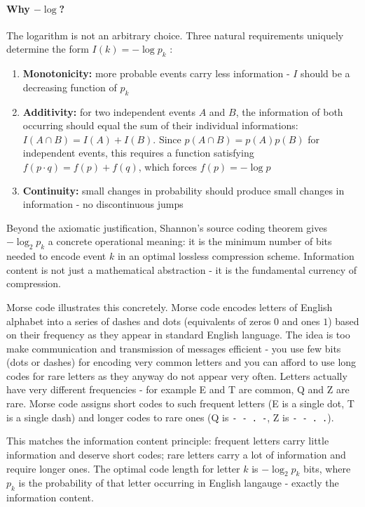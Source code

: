 \paragraph{Why $-\log$?}
The logarithm is not an arbitrary choice. Three natural requirements uniquely determine the form $I(k) = - \log p_k$ \parencite{Shannon1948}:
\begin{enumerate}
    \item \textbf{Monotonicity:} more probable events carry less information - $I$ should be a decreasing function of $p_k$
    \item \textbf{Additivity:} for two independent events $A$ and $B$, the information of both occurring should equal the sum of their individual informations: $I(A \cap B) = I(A) + I(B)$. Since $p(A \cap B) = p(A)p(B)$ for independent events, this requires a function satisfying $f(p \cdot q) = f(p) + f(q)$, which forces $f(p) = - \log p$
    \item \textbf{Continuity:} small changes in probability should produce small changes in information - no discontinuous jumps
\end{enumerate}
Beyond the axiomatic justification, Shannon's source coding theorem \parencite{Shannon1948} gives $-\log_2 p_k$ a concrete operational meaning: it is the minimum number of bits needed to encode event $k$ in an optimal lossless compression scheme. Information content is not just a mathematical abstraction - it is the fundamental currency of compression.

Morse code illustrates this concretely. Morse code encodes letters of English alphabet into a series of dashes and dots (equivalents of zeros $0$ and ones $1$) based on their frequency as they appear in standard English language. The idea is too make communication and transmission of messages efficient - you use few bits (dots or dashes) for encoding very common letters and you can afford to use long codes for rare letters as they anyway do not appear very often. Letters actually have very different frequencies - for example E and T are common, Q and Z are rare. Morse code assigns short codes to such frequent letters (E is a single dot, T is a single dash) and longer codes to rare ones (Q is \texttt{- - . -}, Z is \texttt{- - . .}).

This matches the information content principle: frequent letters carry little information and deserve short codes; rare letters carry a lot of information and require longer ones. The optimal code length for letter $k$ is $-\log_2 p_k$ bits, where $p_k$ is the probability of that letter occurring in English langauge - exactly the information content.

